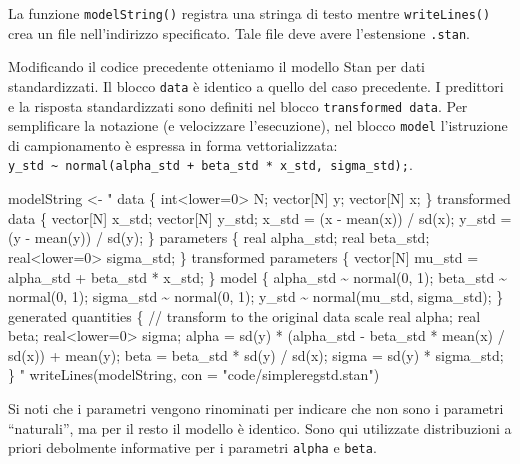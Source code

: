 \documentclass[
  11pt,
]{krantz}
\makeatletter
\newenvironment{Shaded}{\begin{snugshade}}{\end{snugshade}}
\newcommand{\AttributeTok}[1]{\textcolor[rgb]{0.61,0.61,0.61}{#1}}
\newcommand{\FunctionTok}[1]{\textcolor[rgb]{0,0,0}{#1}}
\newcommand{\NormalTok}[1]{#1}
\newcommand{\OtherTok}[1]{\textcolor[rgb]{0.37,0.37,0.37}{#1}}
\newcommand{\StringTok}[1]{\textcolor[rgb]{0.5,0.5,0.5}{#1}}
\newenvironment{kframe}{%
\medskip{}
\setlength{\fboxsep}{.8em}
 \def\at@end@of@kframe{}%
 \ifinner\ifhmode%
  \def\at@end@of@kframe{\end{minipage}}%
  \begin{minipage}{\columnwidth}%
 \fi\fi%
 \def\FrameCommand##1{\hskip\@totalleftmargin \hskip-\fboxsep
 \colorbox{shadecolor}{##1}\hskip-\fboxsep
     \hskip-\linewidth \hskip-\@totalleftmargin \hskip\columnwidth}%
 \MakeFramed {\advance\hsize-\width
   \@totalleftmargin\z@ \linewidth\hsize
   \@setminipage}}%
 {\par\unskip\endMakeFramed%
 \at@end@of@kframe}
\renewenvironment{Shaded}{\begin{kframe}}{\end{kframe}}
\makeatother
\begin{document}
La funzione \texttt{modelString()} registra una stringa di testo mentre \texttt{writeLines()} crea un file nell'indirizzo specificato. Tale file deve avere l'estensione \texttt{.stan}.

Modificando il codice precedente otteniamo il modello Stan per dati standardizzati. Il blocco \texttt{data} è identico a quello del caso precedente. I predittori e la risposta standardizzati sono definiti nel blocco \texttt{transformed\ data}. Per semplificare la notazione (e velocizzare l'esecuzione), nel blocco \texttt{model} l'istruzione di campionamento è espressa in forma vettorializzata: \texttt{y\_std\ \textasciitilde{}\ normal(alpha\_std\ +\ beta\_std\ *\ x\_std,\ sigma\_std);}.

\begin{Shaded}
\begin{Highlighting}[]
\NormalTok{modelString }\OtherTok{\textless{}{-}} \StringTok{"}
\StringTok{data \{}
\StringTok{  int\textless{}lower=0\textgreater{} N;}
\StringTok{  vector[N] y;}
\StringTok{  vector[N] x;}
\StringTok{\}}
\StringTok{transformed data \{}
\StringTok{  vector[N] x\_std;}
\StringTok{  vector[N] y\_std;}
\StringTok{  x\_std = (x {-} mean(x)) / sd(x);}
\StringTok{  y\_std = (y {-} mean(y)) / sd(y);}
\StringTok{\}}
\StringTok{parameters \{}
\StringTok{  real alpha\_std;}
\StringTok{  real beta\_std;}
\StringTok{  real\textless{}lower=0\textgreater{} sigma\_std;}
\StringTok{\}}
\StringTok{transformed parameters \{}
\StringTok{  vector[N] mu\_std = alpha\_std + beta\_std * x\_std;}
\StringTok{\}}
\StringTok{model \{}
\StringTok{  alpha\_std \textasciitilde{} normal(0, 1);}
\StringTok{  beta\_std \textasciitilde{} normal(0, 1);}
\StringTok{  sigma\_std \textasciitilde{} normal(0, 1);}
\StringTok{  y\_std \textasciitilde{} normal(mu\_std, sigma\_std);}
\StringTok{\}}
\StringTok{generated quantities \{}
\StringTok{  // transform to the original data scale}
\StringTok{  real alpha;}
\StringTok{  real beta;}
\StringTok{  real\textless{}lower=0\textgreater{} sigma;}
\StringTok{  alpha = sd(y) * (alpha\_std {-} beta\_std * mean(x) / sd(x)) + mean(y);}
\StringTok{  beta = beta\_std * sd(y) / sd(x);}
\StringTok{  sigma = sd(y) * sigma\_std;}
\StringTok{\}}
\StringTok{"}
\FunctionTok{writeLines}\NormalTok{(modelString, }\AttributeTok{con =} \StringTok{"code/simpleregstd.stan"}\NormalTok{)}
\end{Highlighting}
\end{Shaded}

Si noti che i parametri vengono rinominati per indicare che non sono i parametri ``naturali'', ma per il resto il modello è identico. Sono qui utilizzate distribuzioni a priori debolmente informative per i parametri \texttt{alpha} e \texttt{beta}.
\end{document}
